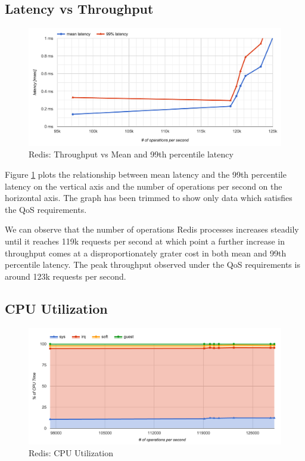 \subsection{Latency vs Throughput}

\begin{figure}[h]
    \includegraphics[width=\textwidth]{./res/6_default_latency_ops.png}
    \caption{Redis: Throughput vs Mean and 99th percentile latency}
    \label{fig:redis-default-latency-ops}
\end{figure}

Figure \ref{fig:redis-default-latency-ops} plots the relationship between mean latency and the 99th percentile latency on the vertical axis and the number of operations per second on the horizontal axis. The graph has been trimmed to show only data which satisfies the QoS requirements.

We can observe that the number of operations Redis processes increases steadily until it reaches 119k requests per second at which point a further increase in throughput comes at a disproportionately grater cost in both mean and 99th percentile latency. The peak throughput observed under the QoS requirements is around 123k requests per second.


\subsection{CPU Utilization}

\begin{figure}[h]
    \includegraphics[width=\textwidth]{./res/6_default_cpu.png}
    \caption{Redis: CPU Utilization}
    \label{fig:redis-default-cpu}
\end{figure}

